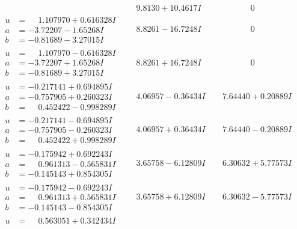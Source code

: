 \documentclass[1p]{elsarticle_modified}
\theoremstyle{definition}
\begin{document}
$$\begin{array}{c|c|c}
 & \phantom{-}9.8130 + 10.4617 I & \phantom{-0.000000 } 0 \\ \hline\begin{aligned}
u &= \phantom{-}1.107970 + 0.616328 I \\
a &= -3.72207 - 1.65268 I \\
b &= -0.81689 - 3.27015 I\end{aligned}
 & \phantom{-}8.8261 - 16.7248 I & \phantom{-0.000000 } 0 \\ \hline\begin{aligned}
u &= \phantom{-}1.107970 - 0.616328 I \\
a &= -3.72207 + 1.65268 I \\
b &= -0.81689 + 3.27015 I\end{aligned}
 & \phantom{-}8.8261 + 16.7248 I & \phantom{-0.000000 } 0 \\ \hline\begin{aligned}
u &= -0.217141 + 0.694895 I \\
a &= -0.757905 + 0.260323 I \\
b &= \phantom{-}0.452422 - 0.998289 I\end{aligned}
 & \phantom{-}4.06957 - 0.36434 I & \phantom{-}7.64440 + 0.20889 I \\ \hline\begin{aligned}
u &= -0.217141 - 0.694895 I \\
a &= -0.757905 - 0.260323 I \\
b &= \phantom{-}0.452422 + 0.998289 I\end{aligned}
 & \phantom{-}4.06957 + 0.36434 I & \phantom{-}7.64440 - 0.20889 I \\ \hline\begin{aligned}
u &= -0.175942 + 0.692243 I \\
a &= \phantom{-}0.961313 - 0.565831 I \\
b &= -0.145143 + 0.854305 I\end{aligned}
 & \phantom{-}3.65758 - 6.12809 I & \phantom{-}6.30632 + 5.77573 I \\ \hline\begin{aligned}
u &= -0.175942 - 0.692243 I \\
a &= \phantom{-}0.961313 + 0.565831 I \\
b &= -0.145143 - 0.854305 I\end{aligned}
 & \phantom{-}3.65758 + 6.12809 I & \phantom{-}6.30632 - 5.77573 I \\ \hline\begin{aligned}
u &= \phantom{-}0.563051 + 0.342434 I \\

\end{aligned}
\end{array}$$
\end{document}
